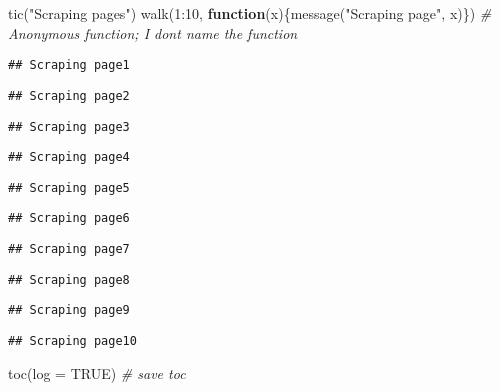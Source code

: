 \documentclass[
]{book}
\newenvironment{Shaded}{\begin{snugshade}}{\end{snugshade}}
\newcommand{\AttributeTok}[1]{\textcolor[rgb]{0.77,0.63,0.00}{#1}}
\newcommand{\CommentTok}[1]{\textcolor[rgb]{0.56,0.35,0.01}{\textit{#1}}}
\newcommand{\ConstantTok}[1]{\textcolor[rgb]{0.00,0.00,0.00}{#1}}
\newcommand{\ControlFlowTok}[1]{\textcolor[rgb]{0.13,0.29,0.53}{\textbf{#1}}}
\newcommand{\DecValTok}[1]{\textcolor[rgb]{0.00,0.00,0.81}{#1}}
\newcommand{\FunctionTok}[1]{\textcolor[rgb]{0.00,0.00,0.00}{#1}}
\newcommand{\NormalTok}[1]{#1}
\newcommand{\SpecialCharTok}[1]{\textcolor[rgb]{0.00,0.00,0.00}{#1}}
\newcommand{\StringTok}[1]{\textcolor[rgb]{0.31,0.60,0.02}{#1}}
\begin{document}
\begin{Shaded}
\begin{Highlighting}[]
\FunctionTok{tic}\NormalTok{(}\StringTok{"Scraping pages"}\NormalTok{)}
\FunctionTok{walk}\NormalTok{(}\DecValTok{1}\SpecialCharTok{:}\DecValTok{10}\NormalTok{, }\ControlFlowTok{function}\NormalTok{(x)\{}\FunctionTok{message}\NormalTok{(}\StringTok{"Scraping page"}\NormalTok{, x)\}) }\CommentTok{\# Anonymous function; I don\textquotesingle{}t name the function }
\end{Highlighting}
\end{Shaded}

\begin{verbatim}
## Scraping page1
\end{verbatim}

\begin{verbatim}
## Scraping page2
\end{verbatim}

\begin{verbatim}
## Scraping page3
\end{verbatim}

\begin{verbatim}
## Scraping page4
\end{verbatim}

\begin{verbatim}
## Scraping page5
\end{verbatim}

\begin{verbatim}
## Scraping page6
\end{verbatim}

\begin{verbatim}
## Scraping page7
\end{verbatim}

\begin{verbatim}
## Scraping page8
\end{verbatim}

\begin{verbatim}
## Scraping page9
\end{verbatim}

\begin{verbatim}
## Scraping page10
\end{verbatim}

\begin{Shaded}
\begin{Highlighting}[]
\FunctionTok{toc}\NormalTok{(}\AttributeTok{log =} \ConstantTok{TRUE}\NormalTok{) }\CommentTok{\# save toc }
\end{Highlighting}
\end{Shaded}
\end{document}
